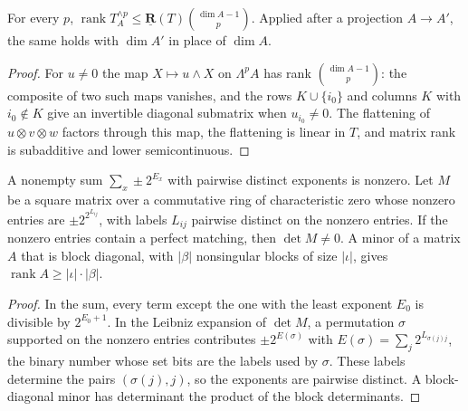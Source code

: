 \begin{theorem}
  \label{thm:frontiers-koszul-flattening}
  \leanok
  For every $p$, $\operatorname{rank} T_A^{\wedge p} \le
  \underline{\mathbf{R}}(T) \binom{\dim A - 1}{p}$. Applied after a projection
  $A \to A'$, the same holds with $\dim A'$ in place of $\dim A$.
\end{theorem}
\begin{proof}
  \leanok
  For $u \ne 0$ the map $X \mapsto u \wedge X$ on $\Lambda^p A$ has rank
  $\binom{\dim A - 1}{p}$: the composite of two such maps vanishes, and the rows
  $K \cup \{i_0\}$ and columns $K$ with $i_0 \notin K$ give an invertible diagonal
  submatrix when $u_{i_0} \ne 0$. The flattening of $u \otimes v \otimes w$ factors
  through this map, the flattening is linear in $T$, and matrix rank is subadditive and
  lower semicontinuous.
\end{proof}

\begin{lemma}
  \label{lem:frontiers-dominant-minors}
  \leanok
  A nonempty sum $\sum_x \pm 2^{E_x}$ with pairwise distinct exponents is nonzero. Let $M$
  be a square matrix over a commutative ring of characteristic zero whose nonzero entries
  are $\pm 2^{2^{L_{ij}}}$, with labels $L_{ij}$ pairwise distinct on the nonzero entries.
  If the nonzero entries contain a perfect matching, then $\det M \ne 0$. A minor of a
  matrix $A$ that is block diagonal, with $|\beta|$ nonsingular blocks of size $|\iota|$,
  gives $\operatorname{rank} A \ge |\iota| \cdot |\beta|$.
\end{lemma}
\begin{proof}
  \leanok
  In the sum, every term except the one with the least exponent $E_0$ is divisible by
  $2^{E_0 + 1}$. In the Leibniz expansion of $\det M$, a permutation $\sigma$ supported on
  the nonzero entries contributes $\pm 2^{E(\sigma)}$ with
  $E(\sigma) = \sum_j 2^{L_{\sigma(j) j}}$, the binary number whose set bits are the labels
  used by $\sigma$. These labels determine the pairs $(\sigma(j), j)$, so the exponents are
  pairwise distinct. A block-diagonal minor has determinant the product of the block
  determinants.
\end{proof}

